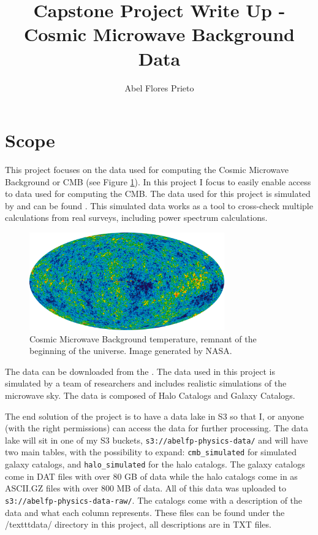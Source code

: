 \documentclass[12pt,letterpaper]{article}
\author{Abel Flores Prieto}
\title{Capstone Project Write Up - Cosmic Microwave Background Data}
\newcommand{\MYhref}[3][blue]{\href{#2}{\color{#1}{#3}}}%
\begin{document}
\maketitle

\section*{Scope}
This project focuses on the data used for computing the Cosmic Microwave
Background or CMB (see Figure \ref{fig:cmb}). In this project I focus to easily
enable access to data used for computing the CMB. The data used for this
project is simulated by \MYhref{https://arxiv.org/abs/0908.0540}{Sehgal et al.
(2010)} and can be found
\MYhref{https://lambda.gsfc.nasa.gov/simulation/tb\_sim\_ov.cfm}{here}. This
simulated data works as a tool to cross-check multiple calculations from real
surveys, including power spectrum calculations.

\begin{figure}[h!]
    \centering
    \includegraphics[width=0.75\textwidth]{imgs/cmb_temp.png}
    \caption{Cosmic Microwave Background temperature, remnant of the beginning
    of the universe. Image generated by NASA.}
    \label{fig:cmb}
\end{figure}

The data can be downloaded from the \MYhref{https://lambda.gsfc.nasa.gov}{Legacy
Archive for Microwave Background Data Analysis}. The data used in this project
is simulated by a team of researchers and includes realistic simulations of the
microwave sky. The data is composed of Halo Catalogs and Galaxy Catalogs.

The end solution of the project is to have a data lake in S3 so that I, or
anyone (with the right permissions) can access the data for further processing.
The data lake will sit in one of my S3 buckets,
\texttt{s3://abelfp-physics-data/} and will have two main tables, with the
possibility to expand: \texttt{cmb\_simulated} for simulated galaxy catalogs,
and \texttt{halo\_simulated} for the halo catalogs.
The galaxy catalogs come in DAT files with over 80 GB of data while the halo
catalogs come in as ASCII.GZ files with over 800 MB of data. All of this data
was uploaded to \texttt{s3://abelfp-physics-data-raw/}. The catalogs come with
a description of the data and what each column represents. These files can be
found under the /texttt{data/} directory in this project, all descriptions are
in TXT files.
\end{document}
